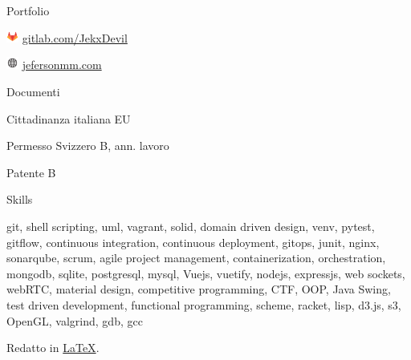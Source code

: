 \documentclass{cv} %
\def\iconsize{0.4cm}
\def\sidespacing{0.5cm}
\begin{document}
\begin{minipage}[b][0.9\paperheight][t]{0.29\linewidth}
\begin{rSection}{Portfolio}
        \item[]\includegraphics[width=\iconsize, trim={0cm 0.5cm 0cm 0cm}]{gitlab-icon.png}
        \href{https://gitlab.com/JekxDevil}{gitlab.com/JekxDevil}

        \item[]\includegraphics[width=\iconsize, trim={0cm 0.12cm 0.03cm 0cm}]{website.png}
        \href{http://jefersonmm.com}{jefersonmm.com}
    \end{rSection}

    \vspace{\sidespacing}

    \begin{rSection}{Documenti}
        \item[] Cittadinanza italiana EU
        \item[] Permesso Svizzero B, ann. lavoro
        \item[] Patente B
    \end{rSection}

    \tiny
    \begin{rSection}{Skills}
        \item[] git, shell scripting, uml, vagrant, solid, domain driven design,
        venv, pytest, gitflow, continuous integration, continuous deployment,
        gitops, junit, nginx, sonarqube, scrum, agile project management, containerization,
        orchestration,
        mongodb, sqlite, postgresql, mysql, %
        Vuejs, vuetify, nodejs, expressjs, web sockets, webRTC, material design, %
        competitive programming, CTF, OOP, Java Swing, test driven development,
        functional programming, scheme, racket, lisp, d3.js, s3, OpenGL, valgrind, gdb, gcc
    \end{rSection}
    \normalsize

    \vspace{2cm}
    Redatto in \href{https://github.com/JekxDevil/curriculum-vitae}{\LaTeX}.

\end{minipage}
\hspace{0.1cm}
\end{document}
